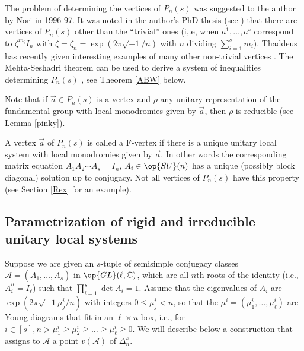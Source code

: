  The problem of determining the vertices of $P_n(s)$ was suggested to the author by Nori in 1996-97. It was noted in the author's PhD thesis (see \cite[Section 7]{BLocal}) that there are vertices of $P_n(s)$ other than the ``trivial'' ones (i,.e,  when $a^1,\dots,a^s$ correspond to $\zeta^{m_i} I_n$ with $\zeta=\zeta_n=\exp(2\pi\sqrt{-1}/n)$  with $n$ dividing $\sum_{i=1}^s m_i$). Thaddeus has  recently given interesting examples of many other non-trivial vertices \cite{thaddy}. The Mehta-Seshadri theorem \cite{MS}  can be used to derive a system of inequalities
 determining $P_n(s)$ \cite{Biswas,AW,BLocal}, see Theorem \ref{ABW} below.

 Note that if $\vec{a}\in P_n(s)$ is a vertex and $\rho$ any unitary representation of the fundamental group
 with local monodromies given by $\vec{a}$, then $\rho$ is reducible (see Lemma \ref{pinky}).
\begin{definition}
\notready\label{defFprime}
A  vertex $\vec{a}$ of $P_n(s)$ is called a F-vertex if there is a unique unitary local system with  local monodromies given by $\vec{a}$. In other words the corresponding matrix equation  $A_1A_2\cdots A_s=I_n$, $A_i\in \op{SU}(n)$ has a unique (possibly block diagonal) solution up to conjugacy.
Not all vertices of $P_n(s)$ have this property (see Section \ref{Rex} for an example).
\end{definition}
\subsection{Parametrization of rigid and irreducible unitary local systems}\label{newRigid}
 Suppose we are given an $s$-tuple of semisimple  conjugacy classes $\mathcal{A}=(\bar{A}_1,\dots,\bar{A}_s)$ in $\op{GL}(\ell,\Bbb{C})$, which are all $n$th roots of the identity (i.e., $\bar{A}_i^n=I_{\ell}$) such that  $\prod_{i=1}^s\det \bar{A}_i=1$. Assume  that  the eigenvalues of $\bar{A}_i$ are $\exp(2\pi\sqrt{-1}\mu_j^i/n)$ with integers $0\leq \mu_j^i<n$, so that the $\mu^i=(\mu^i_1,\dots,\mu^i_{\ell})$ are Young diagrams that fit in an $\ell\times n$ box, i.e.,  for $i\in [s], n> \mu^i_1\geq \mu^i_2\geq \dots \geq \mu^i_{\ell}\geq 0$. We will describe below a construction that assigns to $\mathcal{A}$ a point $v(\mathcal{A})$ of $\Delta_{n}^s$.

